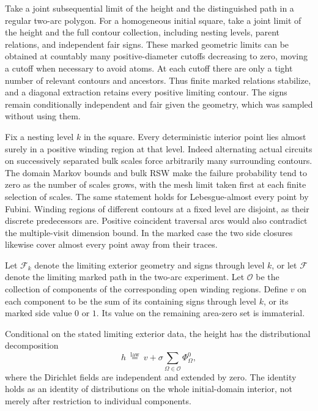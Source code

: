 Take a joint subsequential limit of the height and the distinguished
path in a regular two-arc polygon.  For a homogeneous initial square,
take a joint limit of the height and the full contour collection,
including nesting levels, parent relations, and independent fair signs.
These marked geometric limits can be obtained at countably many
positive-diameter cutoffs decreasing to zero, moving a cutoff when
necessary to avoid atoms.  At each cutoff there are only a tight
number of relevant contours and ancestors.  Thus finite marked
relations stabilize, and a diagonal extraction retains every positive
limiting contour.  The signs remain conditionally independent and
fair given the geometry, which was sampled without using them.

Fix a nesting level $k$ in the square.  Every deterministic interior
point lies almost surely in a positive winding region at that level.
Indeed alternating actual circuits on successively separated bulk
scales force arbitrarily many surrounding contours.  The domain
Markov bounds and bulk RSW make the failure probability tend to zero
as the number of scales grows, with the mesh limit taken first at
each finite selection of scales.  The same statement holds for
Lebesgue-almost every point by Fubini.  Winding regions of different
contours at a fixed level are disjoint, as their discrete predecessors
are.  Positive coincident traversal arcs would also contradict the
multiple-visit dimension bound.  In the marked case the two side
closures likewise cover almost every point away from their traces.

Let $\mathcal F_k$ denote the limiting exterior geometry and signs
through level $k$, or let $\mathcal F$ denote the limiting marked
path in the two-arc experiment.  Let $\mathcal O$ be the collection
of components of the corresponding open winding regions.  Define
$v$ on each component to be the sum of its containing signs through
level $k$, or its marked side value $0$ or $1$.  Its value on the
remaining area-zero set is immaterial.

\begin{proposition}
\label{q4pocket:conditional-field}
Conditional on the stated limiting exterior data, the height has the
distributional decomposition
\begin{equation}
 h\ \stackrel{\mathrm{law}}=\
 v+\sigma\sum_{\Omega\in\mathcal O}\Phi^0_\Omega,
 \label{q4pocket:conditional-decomposition}
\end{equation}
where the Dirichlet fields are independent and extended by zero.
The identity holds as an identity of distributions on the whole
initial-domain interior, not merely after restriction to individual
components.
\end{proposition}

